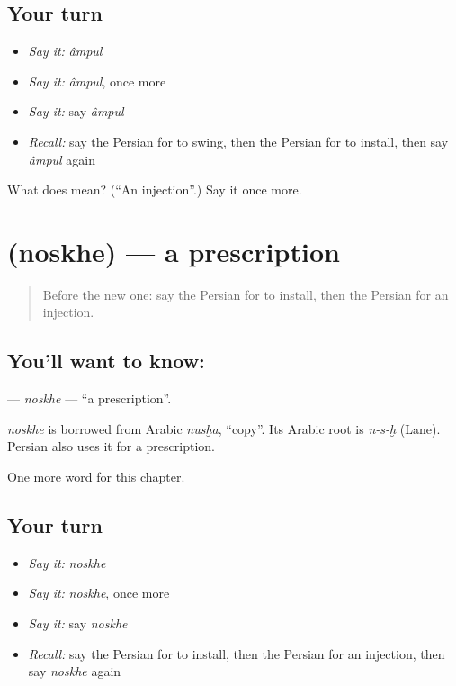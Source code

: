 \subsection*{Your turn}
\begin{itemize}
\raggedright
  \item \emph{Say it:} \emph{âmpul}
  \item \emph{Say it:} \emph{âmpul}, once more
  \item \emph{Say it:} say \emph{âmpul}
  \item \emph{Recall:} say the Persian for to swing, then the Persian for to install, then say \emph{âmpul} again
\end{itemize}

\begin{tcolorbox}[breakable,colback=teal!4,colframe=teal!35!black,title={Before you move on}]
What does  mean? (\textquotedblleft{}An injection\textquotedblright{}.) Say it once more.
\end{tcolorbox}
\section[\texorpdfstring{\fa{نسخه} (noskhe)}{نسخه (noskhe)}]{ (noskhe) — a prescription}

\label{lesson:FA-C189-noskhe}



\begin{quote}
Before the new one: say the Persian for to install, then the Persian for an injection.
\end{quote}

\subsection*{You'll want to know: }
\textbf{} — \emph{noskhe} — \textquotedblleft{}a prescription\textquotedblright{}.

\begin{cousinweb}
\emph{noskhe} is borrowed from Arabic \emph{nusḫa}, \textquotedblleft{}copy\textquotedblright{}. Its Arabic root is \emph{n-s-ḫ} (Lane). Persian also uses it for a prescription.
\end{cousinweb}

\begin{grammarlens}[title={What you've built}]
One more word for this chapter.
\end{grammarlens}

\subsection*{Your turn}
\begin{itemize}
\raggedright
  \item \emph{Say it:} \emph{noskhe}
  \item \emph{Say it:} \emph{noskhe}, once more
  \item \emph{Say it:} say \emph{noskhe}
  \item \emph{Recall:} say the Persian for to install, then the Persian for an injection, then say \emph{noskhe} again
\end{itemize}


